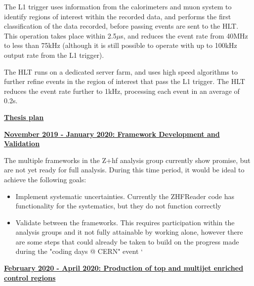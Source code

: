 \documentclass[12pt,a4paper,epsf,portrait,times,epsfig]{article}
\begin{document}
		The L1 trigger uses information from the calorimeters and muon system to identify regions of interest within the recorded data, and performs the first classification of the data recorded, before passing events are sent to the HLT. This operation takes place within 2.5$\mu$s, and reduces the event rate from 40MHz to less than 75kHz (although it is
		still possible to operate with up to 100kHz output rate from the L1 trigger). \par
		The HLT runs on a dedicated server farm, and uses high speed algorithms to further refine events in the region of interest that pass the L1 trigger. The HLT reduces the event rate further to 1kHz, processing each event in an average of 0.2s. \par
		
		
		
		
		
		\newpage
		
		\large \bf \underline{Thesis plan}
		
		\bigskip
		
		\small \bf \underline{November 2019 - January 2020: Framework Development and Validation}
		
		\normalfont The multiple frameworks in the Z+hf analysis group currently show promise, but are not yet ready for full analysis. During this time period, it would be ideal to achieve the following goals: 
		
		\begin{itemize}
		\item Implement systematic uncertainties. Currently the ZHFReader code has functionality for the systematics, but they do not function correctly
		\item Validate between the frameworks. This requires participation within the analysis groups and it not fully attainable by working alone, however there are some steps that could already be taken to build on the progress made during the "coding days @ CERN" event
`		\end{itemize}

		\bf \underline{February 2020 - April 2020: \newline Production of top and multijet enriched control regions}
		
\end{document}
